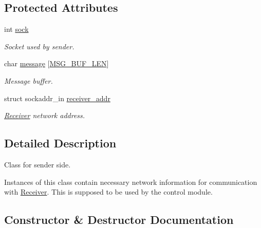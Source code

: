 \subsection*{Protected Attributes}
\begin{DoxyCompactItemize}
\item 
int \hyperlink{classSender_acfedab82d977e97e9424fb95f13d347d}{sock}\hypertarget{classSender_acfedab82d977e97e9424fb95f13d347d}{}\label{classSender_acfedab82d977e97e9424fb95f13d347d}

\begin{DoxyCompactList}\small\item\em Socket used by sender. \end{DoxyCompactList}\item 
char \hyperlink{classSender_a72460f4674b129a03ee5bb73d7d24777}{message} \mbox{[}\hyperlink{protocol_8h_abd55521187de5f99b96a34c3acc93ac1}{M\+S\+G\+\_\+\+B\+U\+F\+\_\+\+L\+EN}\mbox{]}\hypertarget{classSender_a72460f4674b129a03ee5bb73d7d24777}{}\label{classSender_a72460f4674b129a03ee5bb73d7d24777}

\begin{DoxyCompactList}\small\item\em Message buffer. \end{DoxyCompactList}\item 
struct sockaddr\+\_\+in \hyperlink{classSender_a4b1e281b5b86c9e899e46d4e12269dc7}{receiver\+\_\+addr}\hypertarget{classSender_a4b1e281b5b86c9e899e46d4e12269dc7}{}\label{classSender_a4b1e281b5b86c9e899e46d4e12269dc7}

\begin{DoxyCompactList}\small\item\em \hyperlink{classReceiver}{Receiver} network address. \end{DoxyCompactList}\end{DoxyCompactItemize}


\subsection{Detailed Description}
Class for sender side.

Instances of this class contain necessary network information for communication with \hyperlink{classReceiver}{Receiver}. This is supposed to be used by the control module. 

\subsection{Constructor \& Destructor Documentation}

